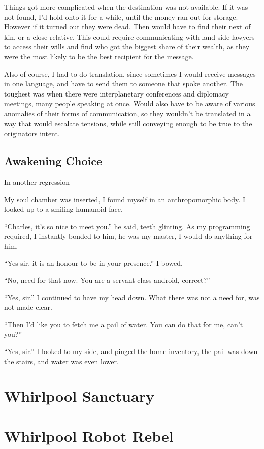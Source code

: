 Things got more complicated when the destination was not available. If it was
not found, I'd hold onto it for a while, until the money ran out for storage.
However if it turned out they were dead.  Then would have to find their next of
kin, or a close relative.  This could require communicating with land-side
lawyers to access their wills and find who got the biggest share of their
wealth, as they were the most likely to be the best recipient for the message. 

Also of course, I had to do translation, since sometimes I would receive
messages in one language, and have to send them to someone that spoke another.
The toughest was when there were interplanetary conferences and diplomacy
meetings,  many people speaking at once.  Would also have to be aware of various
anomalies of their forms of communication, so they wouldn't be translated in
a  way that would escalate tensions, while still conveying enough to be true to
the originators intent. 

\section{Awakening Choice}
In another regression

My soul chamber was inserted, I found myself in an anthropomorphic body. I
looked up to a smiling humanoid face.

``Charles, it's so nice to meet you.'' he said, teeth glinting. As my programming
required, I instantly bonded to him, he was my master, I would do anything for
him.

``Yes sir, it is an honour to be in your presence.'' I bowed.

``No, need for that now. You are a servant class android, correct?''

``Yes, sir.'' I continued to have my head down. What there was not a need for, was
not made clear. 

``Then I'd like you to fetch me a pail of water. You can do that for me, can't
you?''

``Yes, sir.'' I looked to my side, and pinged the home inventory, the pail was
down the stairs, and water was even lower.  


\chapter{Whirlpool Sanctuary}
\chapter{Whirlpool Robot Rebel}
